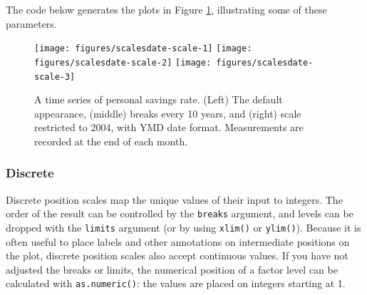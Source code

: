 The code below generates the plots in Figure \ref{fig:date-scale},
illustrating some of these parameters.

\begin{Shaded}
\end{Shaded}

\begin{figure}

{\centering \texttt{[image: figures/scalesdate-scale-1]} \texttt{[image: figures/scalesdate-scale-2]} \texttt{[image: figures/scalesdate-scale-3]} 

}

\caption{A time series of personal savings rate. (Left) The default appearance, (middle) breaks every 10 years, and (right) scale restricted to 2004, with YMD date format. Measurements are recorded at the end of each month.\label{fig:date-scale}}
\end{figure}

\subsubsection{Discrete}\label{ssub:scale-discrete}

Discrete position scales map the unique values of their input to
integers. The order of the result can be controlled by the
\texttt{breaks} argument, and levels can be dropped with the
\texttt{limits} argument (or by using \texttt{xlim()} or
\texttt{ylim()}). Because it is often useful to place labels and other
annotations on intermediate positions on the plot, discrete position
scales also accept continuous values. If you have not adjusted the
breaks or limits, the numerical position of a factor level can be
calculated with \texttt{as.numeric()}: the values are placed on integers
starting at 1. 
 

